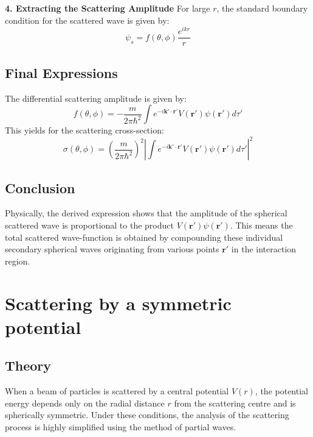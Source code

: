 \documentclass[12pt]{report}
\begin{document}
\textbf{4. Extracting the Scattering Amplitude} For large $r$, the standard boundary condition for the scattered wave is given by:
\begin{equation}
\psi_s = f(\theta, \phi) \frac{e^{ikr}}{r}
\end{equation}

\subsection*{Final Expressions}
The differential scattering amplitude is given by:
\begin{equation}
\boxed{ f(\theta, \phi) = -\frac{m}{2\pi\hbar^2} \int e^{-i\mathbf{k}'\cdot\mathbf{r}'} V(\mathbf{r}')\psi(\mathbf{r}') d\tau' }
\end{equation}
This yields for the scattering cross-section:
\begin{equation}
\boxed{ \sigma(\theta, \phi) = \left( \frac{m}{2\pi\hbar^2} \right)^2 \left| \int e^{-i\mathbf{k}'\cdot\mathbf{r}'} V(\mathbf{r}')\psi(\mathbf{r}') d\tau' \right|^2 }
\end{equation}

\subsection*{Conclusion}
Physically, the derived expression shows that the amplitude of the spherical scattered wave is proportional to the product $V(\mathbf{r}')\psi(\mathbf{r}')$. This means the total scattered wave-function is obtained by compounding these individual secondary spherical waves originating from various points $\mathbf{r}'$ in the interaction region.

\section{Scattering by a symmetric potential}



\subsection*{Theory}
When a beam of particles is scattered by a central potential $V(r)$, the potential energy depends only on the radial distance $r$ from the scattering centre and is spherically symmetric. Under these conditions, the analysis of the scattering process is highly simplified using the method of partial waves.
\end{document}
